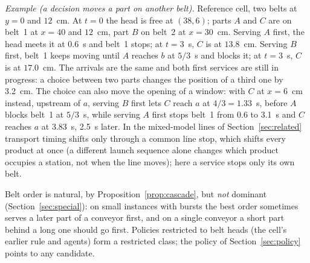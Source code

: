 \documentclass[11pt,a4paper]{article}
\theoremstyle{plain}
\theoremstyle{definition}
\theoremstyle{remark}
\begin{document}
\emph{Example (a decision moves a part on another belt).} Reference cell, two belts at
$y=0$ and $12$~cm. At $t=0$ the head is free at $(38,6)$; parts $A$ and $C$ are on belt~1
at $x=40$ and $12$~cm, part $B$ on belt~2 at $x=30$~cm. Serving $A$ first, the head meets
it at $0.6$~s and belt~1 stops; at $t=3$~s, $C$ is at $13.8$~cm. Serving $B$ first, belt~1
keeps moving until $A$ reaches $b$ at $5/3$~s and blocks it; at $t=3$~s, $C$ is at
$17.0$~cm. The arrivals are the same and both first services are still in progress: a
choice between two parts changes the position of a third one by 3.2~cm. The choice can
also move the opening of a window: with $C$ at $x=6$~cm instead, upstream of $a$, serving
$B$ first lets $C$ reach $a$ at $4/3=1.33$~s, before $A$ blocks belt~1 at $5/3$~s, while
serving $A$ first stops belt~1 from 0.6 to 3.1~s and $C$ reaches $a$ at 3.83~s, 2.5~s
later. In the mixed-model lines of Section~\ref{sec:related} transport timing shifts only
through a common line stop, which shifts every product at once (a different launch
sequence alone changes which product occupies a station, not when the line moves); here
a service stops only its own belt.

Belt order is natural, by Proposition~\ref{prop:cascade}, but \emph{not} dominant
(Section~\ref{sec:special}): on small instances with bursts the best order sometimes
serves a later part of a conveyor first, and on a single conveyor a short part behind a
long one should go first. Policies restricted to belt heads (the cell's earlier rule and
agents) form a restricted class; the policy of Section~\ref{sec:policy} points to any
candidate.
\end{document}
